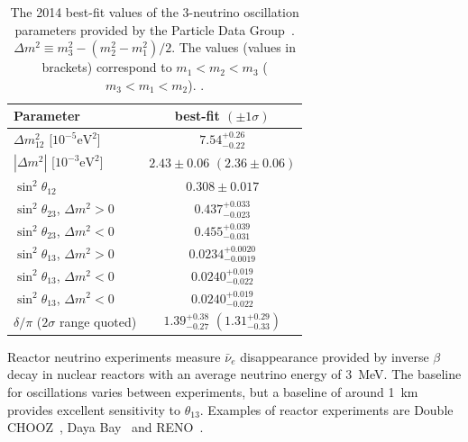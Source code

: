 \begin{table}
  \begin{tabular}{l c }
    Parameter & best-fit $(\pm1\sigma)$ \\ \hline \hline
    $\Delta m^2_{12}$ [$10^{-5}\textrm{eV}^2$] & $7.54^{+0.26}_{-0.22}$ \\
    $|\Delta m^2|$ [$10^{-3}\textrm{eV}^2$] & $2.43\pm0.06$ $(2.36\pm0.06)$ \\
    $\sin^2\theta_{12}$ & $0.308\pm0.017$ \\
    $\sin^2\theta_{23}$, $\Delta m^2 > 0$ & $0.437^{+0.033}_{-0.023}$ \\
    $\sin^2\theta_{23}$, $\Delta m^2 < 0$ & $0.455^{+0.039}_{-0.031}$ \\
    $\sin^2\theta_{13}$, $\Delta m^2 > 0$ & $0.0234^{+0.0020}_{-0.0019}$ \\
    $\sin^2\theta_{13}$, $\Delta m^2 < 0$ & $0.0240^{+0.019}_{-0.022}$ \\
    $\sin^2\theta_{13}$, $\Delta m^2 < 0$ & $0.0240^{+0.019}_{-0.022}$ \\
    $\delta/\pi$ ($2\sigma$ range quoted) & $1.39^{+0.38}_{-0.27}$ $(1.31^{+0.29}_{-0.33})$ \\
  \end{tabular}
  \caption{The 2014 best-fit values of the 3-neutrino oscillation parameters provided by the Particle Data Group~\cite{Agashe:2014kda}. $\Delta m^2 \equiv m^2_3 - \left(m^2_2 - m^2_1\right)/2$. The values (values in brackets) correspond to $m_1 < m_2 < m_3$ ($m_3 < m_1 < m_2$).  .}
  \label{table:NeutrinoOscillationParameterValues}
\end{table}
\newline
\newline
Reactor neutrino experiments measure $\bar{\nu}_e$ disappearance provided by inverse $\beta$ decay in nuclear reactors with an average neutrino energy of 3~MeV.  The baseline for oscillations varies between experiments, but a baseline of around 1~km provides excellent sensitivity to $\theta_{13}$. Examples of reactor experiments are Double CHOOZ~\cite{Abe201366}, Daya Bay~\cite{PhysRevLett.108.171803} and RENO~\cite{PhysRevLett.108.191802}.
